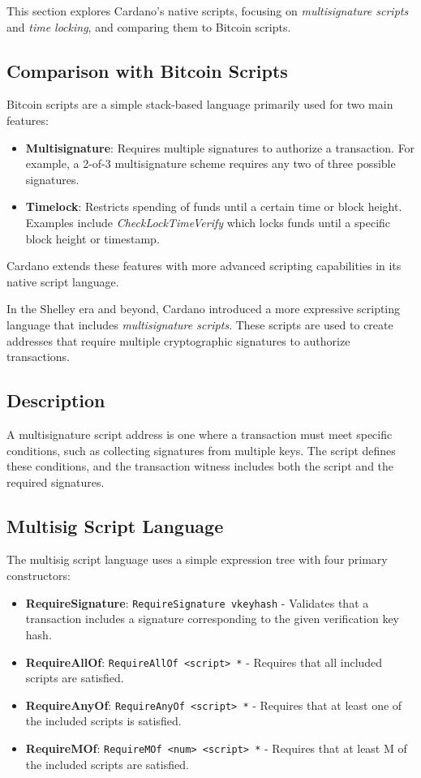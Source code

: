 This section explores Cardano's native scripts, focusing on \textit{multisignature scripts} and \textit{time locking}, and comparing them to Bitcoin scripts. 

\subsection{Comparison with Bitcoin Scripts}

Bitcoin scripts are a simple stack-based language primarily used for two main features:
\begin{itemize}
    \item \textbf{Multisignature}: Requires multiple signatures to authorize a transaction. For example, a 2-of-3 multisignature scheme requires any two of three possible signatures.
    \item \textbf{Timelock}: Restricts spending of funds until a certain time or block height. Examples include \textit{CheckLockTimeVerify} which locks funds until a specific block height or timestamp.
\end{itemize}

Cardano extends these features with more advanced scripting capabilities in its native script language.


In the Shelley era and beyond, Cardano introduced a more expressive scripting language that includes \textit{multisignature scripts}. These scripts are used to create addresses that require multiple cryptographic signatures to authorize transactions. 

\subsection{Description}

A multisignature script address is one where a transaction must meet specific conditions, such as collecting signatures from multiple keys. The script defines these conditions, and the transaction witness includes both the script and the required signatures.

\subsection{Multisig Script Language}

The multisig script language uses a simple expression tree with four primary constructors:

\begin{itemize}
    \item \textbf{RequireSignature}: \texttt{RequireSignature vkeyhash} - Validates that a transaction includes a signature corresponding to the given verification key hash.
    \item \textbf{RequireAllOf}: \texttt{RequireAllOf <script> *} - Requires that all included scripts are satisfied.
    \item \textbf{RequireAnyOf}: \texttt{RequireAnyOf <script> *} - Requires that at least one of the included scripts is satisfied.
    \item \textbf{RequireMOf}: \texttt{RequireMOf <num> <script> *} - Requires that at least M of the included scripts are satisfied.
\end{itemize}

